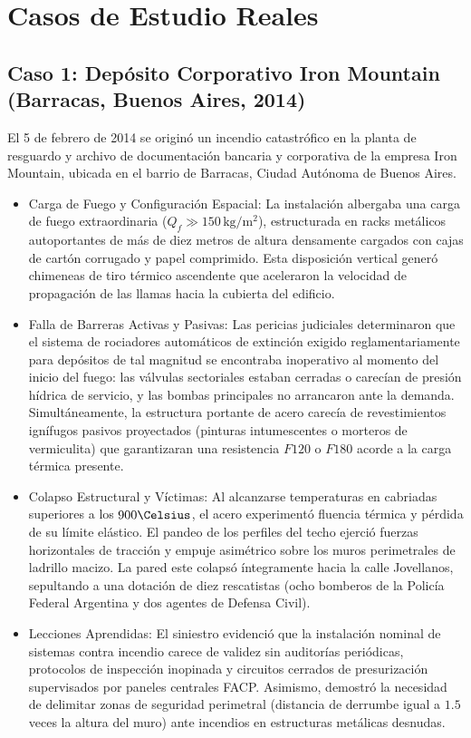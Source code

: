 \chapter{Casos de Estudio Reales}
\label{sec.cap8:casos_estudio}

\section{Caso 1: Depósito Corporativo Iron Mountain (Barracas, Buenos Aires, 2014)}
\label{sec.cap8:iron_mountain}

El 5 de febrero de 2014 se originó un incendio catastrófico en la planta de resguardo y archivo de documentación bancaria
y corporativa de la empresa Iron Mountain, ubicada en el barrio de Barracas, Ciudad Autónoma de Buenos Aires.

\begin{itemize}
    \item Carga de Fuego y Configuración Espacial: La instalación albergaba una carga de fuego extraordinaria ($Q_f \gg
          150\,\mathrm{kg/m^2}$), estructurada en racks metálicos autoportantes de más de diez metros de altura densamente
          cargados con cajas de cartón corrugado y papel comprimido. Esta disposición vertical generó chimeneas de tiro
          térmico ascendente que aceleraron la velocidad de propagación de las llamas hacia la cubierta del edificio.
    \item Falla de Barreras Activas y Pasivas: Las pericias judiciales determinaron que el sistema de rociadores
          automáticos de extinción exigido reglamentariamente para depósitos de tal magnitud se encontraba inoperativo al
          momento del inicio del fuego: las válvulas sectoriales estaban cerradas o carecían de presión hídrica de servicio, y
          las bombas principales no arrancaron ante la demanda. Simultáneamente, la estructura portante de acero carecía de revestimientos ignífugos
          pasivos proyectados (pinturas intumescentes o morteros de vermiculita) que garantizaran una resistencia $F120$ o
          $F180$ acorde a la carga térmica presente.
    \item Colapso Estructural y Víctimas: Al alcanzarse temperaturas en cabriadas superiores a los $900\Celsius$, el
          acero experimentó fluencia térmica y pérdida de su límite elástico. El pandeo de los perfiles del techo ejerció
          fuerzas horizontales de tracción y empuje asimétrico sobre los muros perimetrales de ladrillo macizo. La pared
          este colapsó íntegramente hacia la calle Jovellanos, sepultando a una dotación de diez rescatistas (ocho bomberos
          de la Policía Federal Argentina y dos agentes de Defensa Civil).
    \item Lecciones Aprendidas: El siniestro evidenció que la instalación nominal de sistemas contra incendio carece de
          validez sin auditorías periódicas, protocolos de inspección inopinada y circuitos cerrados de presurización
          supervisados por paneles centrales FACP. Asimismo, demostró la necesidad de delimitar zonas de seguridad
          perimetral (distancia de derrumbe igual a $1.5$ veces la altura del muro) ante incendios en estructuras metálicas
          desnudas.
\end{itemize}

